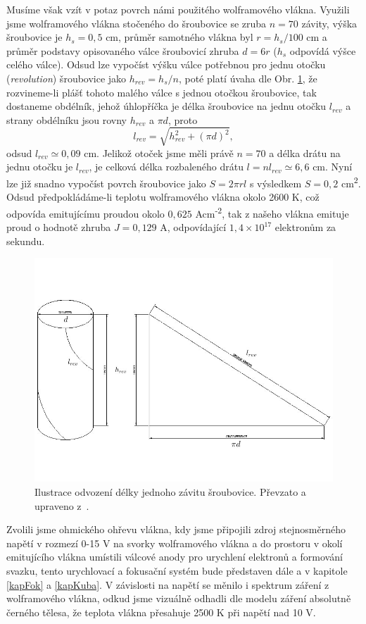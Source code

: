 \par Musíme však vzít v potaz povrch námi použitého wolframového vlákna. Využili jsme wolframového vlákna stočeného do šroubovice se zruba $n=70$ závity, výška šroubovice je $h_s=0,5$ cm, průměr samotného vlákna byl $r=h_s/100$ cm a průměr podstavy opisovaného válce šroubovicí zhruba $d=6r$ ($h_s$ odpovídá výšce celého válce). Odsud lze vypočíst výšku válce potřebnou pro jednu otočku (\textit{revolution}) šroubovice jako $h_{rev}=h_s/n$, poté platí úvaha dle Obr. \ref{HevixUnWrap}, že rozvineme-li plášť tohoto malého válce s jednou otočkou šroubovice, tak dostaneme obdélník, jehož úhlopříčka je délka šroubovice na jednu otočku $l_{rev}$ a strany obdélníku jsou rovny $h_{rev}$ a $\pi d$, proto 
\begin{equation}
l_{rev}=\sqrt{h_{rev}^2+(\pi d)^2},
\end{equation}
odsud $l_{rev}\simeq 0,09$ cm. Jelikož otoček jsme měli právě $n=70$ a délka drátu na jednu otočku je $l_{rev}$, je celková délka rozbaleného drátu $l=nl_{rev}\simeq 6,6$ cm. Nyní lze již snadno vypočíst povrch šroubovice jako $S=2\pi r l$ s výsledkem $S=0,2$ cm\textsuperscript{2}. Odsud předpokládáme-li teplotu wolframového vlákna okolo 2600 K, což odpovída emitujícímu proudou okolo $0,625$ Acm\textsuperscript{-2}, tak z našeho vlákna emituje proud o hodnotě zhruba $J=0,129$ A, odpovídající $1,4\times 10^{17}$ elektronům za sekundu.
\begin{figure}[htbp!]
	\centering
	\includegraphics[width = 350 pt]{HevixUnWrap.jpg}
	\caption{Ilustrace odvození délky jednoho závitu šroubovice. Převzato a upraveno z~\cite{curv}.}
	\label{HevixUnWrap}
\end{figure}
\par Zvolili jsme ohmického ohřevu vlákna, kdy jsme připojili zdroj stejnosměrného napětí v rozmezí 0-15 V na svorky wolframového vlákna a do prostoru v okolí emitujícího vlákna umístili válcové anody pro urychlení elektronů a formování svazku, tento urychlovací a fokusační systém bude představen dále a v kapitole \ref{kapFok} a \ref{kapKuba}. V závislosti na napětí se měnilo i spektrum záření z wolframového vlákna, odkud jsme vizuálně odhadli dle modelu záření absolutně černého tělesa, že teplota vlákna přesahuje 2500 K při napětí nad 10 V. 
